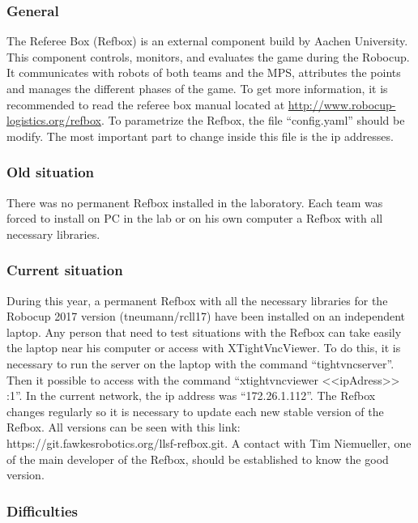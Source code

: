 
\subsubsection{General}

The Referee Box (Refbox) is an external component build by Aachen University. This component controls, monitors, and evaluates the game during the Robocup. It communicates with robots of both teams and the MPS, attributes the points and manages the different phases of the game. To get more information, it is recommended to read the referee box manual located at \url{http://www.robocup-logistics.org/refbox}. To parametrize the Refbox, the file “config.yaml” should be modify. The most important part to change inside this file is the ip addresses.


\subsubsection{Old situation}

There was no permanent Refbox installed in the laboratory. Each team was forced to install on PC in the lab or on his own computer a Refbox with all necessary libraries.


\subsubsection{Current situation}

During this year, a permanent Refbox with all the necessary libraries for the Robocup 2017 version (tneumann/rcll17) have been installed on an independent laptop. Any person that need to test situations with the Refbox can take easily the laptop near his computer or access with XTightVncViewer.  To do this, it is necessary to run the server on the laptop with the command “tightvncserver”. Then it possible to access with the command “xtightvncviewer <<ipAdress>> :1”.  In the current network, the ip address was “172.26.1.112”. The Refbox changes regularly so it is necessary to update each new stable version of the Refbox. All versions can be seen with this link: https://git.fawkesrobotics.org/llsf-refbox.git. A contact with Tim Niemueller, one of the main developer of the Refbox, should be established to know the good version.




\subsubsection{Difficulties}

